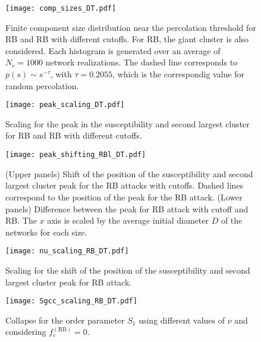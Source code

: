 \documentclass{article}
\begin{document}

\begin{figure}
\centering
\texttt{[image: comp\_sizes\_DT.pdf]}
\caption{Finite component size distribution near the percolation threshold for RB and RB with different cutoffs. For RB, the giant cluster is also considered. Each histogram is generated over an average of $N_r = 1000$ network realizations. The dashed line corresponds to $p(s) \sim s^{-\tau}$, with $\tau = 0.2055$, which is the correspondig value for random percolation.}
\end{figure}

\begin{figure}
\centering
\texttt{[image: peak\_scaling\_DT.pdf]}
\caption{Scaling for the peak in the susceptibility and second largest cluster for RB and RB with different cutoffs. }
\end{figure}

\begin{figure}
\centering
\texttt{[image: peak\_shifting\_RBl\_DT.pdf]}
\caption{(Upper panels) Shift of the position of the susceptibility and second largest cluster peak for the RB attacks with cutoffs. Dashed lines correspond to the position of the peak for the RB attack. (Lower panels) Difference between the peak for RB attack with cutoff and RB. The $x$ axis is scaled by the average initial diameter $D$ of the networks for each size.}
\end{figure}

\begin{figure}
\centering
\texttt{[image: nu\_scaling\_RB\_DT.pdf]}
\caption{Scaling for the shift of the position of the susceptibility and second largest cluster peak for RB attack.}
\end{figure}

\begin{figure}
\centering
\texttt{[image: Sgcc\_scaling\_RB\_DT.pdf]}
\caption{Collapse for the order parameter $S_1$ using different values of $\nu$ and considering $f_c^{\mathrm{(RB)}} = 0$.}
\end{figure}
\end{document}
